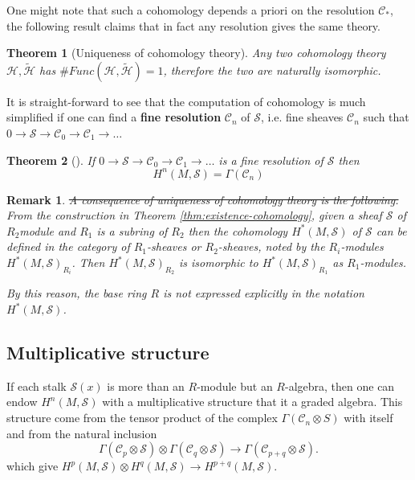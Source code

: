 \documentclass[11pt]{article}
\newtheorem{remark}{Remark}
\newtheorem{theorem}{Theorem}
\begin{document}
One might note that such a cohomology depends a priori on the resolution \(\mathcal{C}_*\), the following result claims that in fact any resolution gives the same theory.

\begin{theorem}[Uniqueness of cohomology theory]
\label{thm:uniqueness-cohomology}
Any two cohomology theory \(\mathcal{H}, \tilde{\mathcal{H}}\) has \(\#Func(\mathcal{H},
\tilde{\mathcal{H}}) =1\), therefore the two are naturally isomorphic.
\end{theorem}

It is straight-forward to see that the computation of cohomology is much simplified if one
can find a \textbf{fine resolution} \(\mathcal{C}_n\) of \(\mathcal{S}\), i.e. fine sheaves
\(\mathcal{C}_n\) such that \(0 \longrightarrow \mathcal{S}\longrightarrow
\mathcal{C}_0 \longrightarrow \mathcal{C}_1 \longrightarrow \dots\)

\begin{theorem}[]
\label{thm:fine-resolution}
If  \(0 \longrightarrow \mathcal{S}\longrightarrow
\mathcal{C}_0 \longrightarrow \mathcal{C}_1 \longrightarrow \dots\) is a fine resolution
of \(\mathcal{S}\) then
\[
H^n(M, \mathcal{S}) = \Gamma(\mathcal{C}_n)
\]
\end{theorem}

\begin{remark}
\sout{A consequence of uniqueness of cohomology theory is the following.} From the construction
in Theorem \ref{thm:existence-cohomology}, given a sheaf \(\mathcal{S}\) of \(R_2\)module and \(R_1\) is a subring of \(R_2\) then the
cohomology \(H^*(M, \mathcal{S})\) of \(\mathcal{S}\) can be defined in the category
of \(R_1\)-sheaves or \(R_2\)-sheaves, noted by the \(R_i\)-modules \(H^*(M,
\mathcal{S})_{R_i}\). Then \(H^*(M, \mathcal{S})_{R_2}\) is isomorphic to \(H^*(M,
\mathcal{S})_{R_1}\) as \(R_1\)-modules.

By this reason, the base ring \(R\) is not expressed explicitly in the notation \(H^*(M, \mathcal{S})\).
\end{remark}


\subsection{Multiplicative structure}
\label{sec:org47e7da3}

If each stalk \(\mathcal{S}(x)\) is more than an \(R\)-module but an \(R\)-algebra, then one can endow \(H^n(M, \mathcal{S})\) with a multiplicative structure
that it a graded algebra. This structure come from the tensor product of the complex \(\Gamma(\mathcal{C}_n\otimes S)\) with itself and from the natural inclusion
\[
\Gamma(\mathcal{C}_p\otimes\mathcal{S}) \otimes \Gamma(\mathcal{C}_q\otimes\mathcal{S})
\longrightarrow \Gamma(\mathcal{C}_{p+q} \otimes \mathcal{S}).
\]
which give \(H^p(M,\mathcal{S})\otimes H^q(M, \mathcal{S}) \longrightarrow H^{p+q}(M,
\mathcal{S})\).
\end{document}
